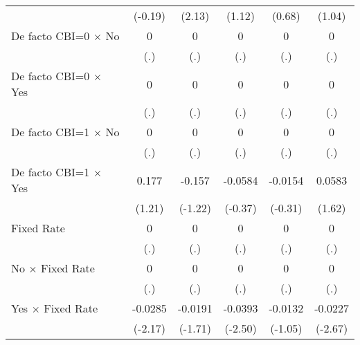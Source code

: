 \begin{table}[htbp]
\begin{tabular}{l*{5}{c}}
                                        &  (-0.19)         &   (2.13)         &   (1.12)         &   (0.68)         &   (1.04)         \\
\addlinespace
De facto CBI=0 $\times$ No              &        0         &        0         &        0         &        0         &        0         \\
                                        &      (.)         &      (.)         &      (.)         &      (.)         &      (.)         \\
\addlinespace
De facto CBI=0 $\times$ Yes             &        0         &        0         &        0         &        0         &        0         \\
                                        &      (.)         &      (.)         &      (.)         &      (.)         &      (.)         \\
\addlinespace
De facto CBI=1 $\times$ No              &        0         &        0         &        0         &        0         &        0         \\
                                        &      (.)         &      (.)         &      (.)         &      (.)         &      (.)         \\
\addlinespace
De facto CBI=1 $\times$ Yes             &    0.177         &   -0.157         &  -0.0584         &  -0.0154         &   0.0583         \\
                                        &   (1.21)         &  (-1.22)         &  (-0.37)         &  (-0.31)         &   (1.62)         \\
\addlinespace
Fixed Rate                              &        0         &        0         &        0         &        0         &        0         \\
                                        &      (.)         &      (.)         &      (.)         &      (.)         &      (.)         \\
\addlinespace
No $\times$ Fixed Rate                  &        0         &        0         &        0         &        0         &        0         \\
                                        &      (.)         &      (.)         &      (.)         &      (.)         &      (.)         \\
\addlinespace
Yes $\times$ Fixed Rate                 &  -0.0285\sym{*}  &  -0.0191         &  -0.0393\sym{*}  &  -0.0132         &  -0.0227\sym{**} \\
                                        &  (-2.17)         &  (-1.71)         &  (-2.50)         &  (-1.05)         &  (-2.67)         \\

\end{tabular}
\end{table}
